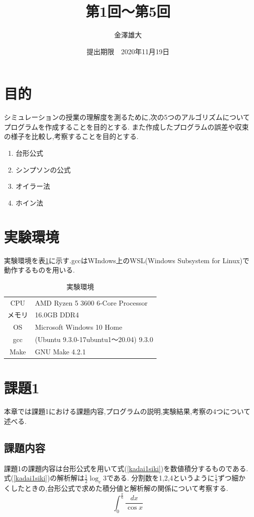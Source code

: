 \documentclass[dvipdfmx]{jarticle}
\title{第1回～第5回}
\date{提出期限　2020年11月19日}
\author{金澤雄大}
\begin{document}
    \maketitle
    \thispagestyle{empty}
    \clearpage
    \addtocounter{page}{-1}
    \section{目的}
    シミュレーションの授業の理解度を測るために,次の5つのアルゴリズムについてプログラムを作成することを目的とする.
    また作成したプログラムの誤差や収束の様子を比較し,考察することを目的とする.
  \begin{enumerate}
  \item 台形公式
  \item シンプソンの公式
  \item オイラー法
  \item ホイン法
  \end{enumerate}
  
    \section{実験環境}
      実験環境を表\ref{env}に示す.gccはWIndows上のWSL(Windows Subsystem for Linux)で動作するものを用いる.
      \begin{table}[H]
        \caption{実験環境}
      \label{env}
      \begin{center}
          \begin{tabular}{c|l}\hline
            CPU & AMD Ryzen 5 3600 6-Core Processor \\ 
            メモリ & 16.0GB DDR4 \\
            OS & Microsoft Windows 10 Home \\
            gcc & (Ubuntu 9.3.0-17ubuntu1～20.04) 9.3.0 \\
            Make & GNU Make 4.2.1 \\ \hline
          \end{tabular}
      \end{center}
      \end{table}

    \section{課題1}
    本章では課題1における課題内容,プログラムの説明,実験結果,考察の4つについて述べる.
    \subsection{課題内容}
    課題1の課題内容は台形公式を用いて式(\ref{kadai1siki})を数値積分するものである.式(\ref{kadai1siki})の解析解は$\frac{1}{2} \log_{e} 3$である.
    分割数を1,2,4というように$\frac{1}{2}$ずつ細かくしたときの,台形公式で求めた積分値と解析解の関係について考察する.
    \begin{equation}
  \int_0^\frac{\pi}{6} \frac{dx}{\cos x}
      \label{kadai1siki}
    \end{equation}
\end{document}
